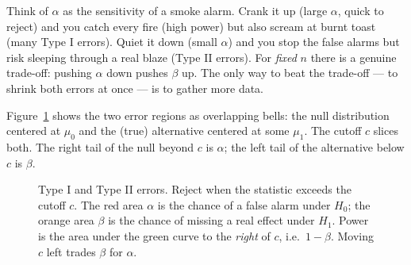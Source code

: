 \begin{intuitionbox}
Think of $\alpha$ as the sensitivity of a smoke alarm. Crank it up (large $\alpha$,
quick to reject) and you catch every fire (high power) but also scream at burnt toast
(many Type I errors). Quiet it down (small $\alpha$) and you stop the false alarms but
risk sleeping through a real blaze (Type II errors). For \emph{fixed} $n$ there is a
genuine trade-off: pushing $\alpha$ down pushes $\beta$ up. The only way to beat the
trade-off --- to shrink both errors at once --- is to gather more data.
\end{intuitionbox}

Figure~\ref{ch32:fig-power} shows the two error regions as overlapping bells: the null
distribution centered at $\mu_0$ and the (true) alternative centered at some $\mu_1$.
The cutoff $c$ slices both. The right tail of the null beyond $c$ is $\alpha$; the left
tail of the alternative below $c$ is $\beta$.

\begin{figure}[H]
\centering
{}
\caption{Type I and Type II errors. Reject when the statistic exceeds the cutoff $c$.
The red area $\alpha$ is the chance of a false alarm under $H_0$; the orange area
$\beta$ is the chance of missing a real effect under $H_1$. Power is the area under the green curve to
the \emph{right} of $c$, i.e.\ $1-\beta$. Moving $c$ left trades $\beta$ for $\alpha$.}
\label{ch32:fig-power}
\end{figure}

